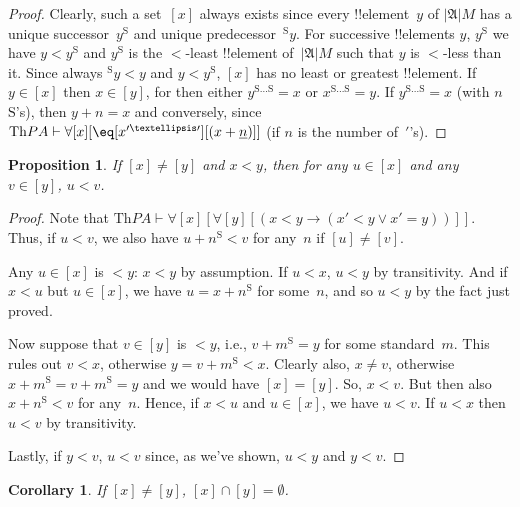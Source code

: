 \documentclass[10pt,a4paper]{article}
\theoremstyle{plain}
\newtheorem{prop}[thm]{Proposition}
\newtheorem{cor}[thm]{Corollary}
\theoremstyle{definition}
\theoremstyle{remark}
\providecommand{\lif}{\mathbin{\rightarrow}}
\providecommand{\lforall}{\mathord{\forall}}
\providecommand{\Proves}{\mathrel{\vdash}}
\providecommand{\Domain}{\ensuremath{|\mathfrak{A}|}}
\providecommand{\Th}{\ensuremath{\mathrm{Th}}}
\providecommand{\num}[1]{\underline{#1}}
\providecommand{\nssucc}{\mathrm{S}}
\providecommand{\nsplus}{\mathbin{+}}
\providecommand{\nsless}{<}
\begin{document}
\begin{proof}
Clearly, such a set~$[x]$ always exists since every !!{element}~$y$ of
$\Domain{M}$ has a unique successor~$y^\nssucc$ and unique
predecessor~$^\nssucc y$. For successive !!{element}s $y$, $y^\nssucc$
we have $y \nsless y^\nssucc$ and $y^\nssucc$ is the $\nsless$-least
!!{element} of~$\Domain{M}$ such that $y$ is $\nsless$-less than it.
Since always $^\nssucc y \nsless y$ and $y \nsless y^\nssucc$, $[x]$
has no least or greatest !!{element}. If $y \in [x]$ then $x \in [y]$,
for then either $y^{\nssucc\dots\nssucc} = x$ or
$x^{\nssucc\dots\nssucc} = y$.  If $y^{\nssucc\dots\nssucc} = x$ (with
$n$ $\nssucc$'s), then $y \nsplus n = x$ and conversely, since
$\Th{PA} \Proves \lforall[x][\eq[x^{\prime\dots\prime}][(x +
    \num{n})]]$ (if $n$ is the number of~$\prime$'s).
\end{proof}

\begin{prop}
If $[x] \neq [y]$ and $x \nsless y$, then for any $u \in [x]$ and any
$v \in [y]$, $u \nsless v$.
\end{prop}

\begin{proof}
Note that $\Th{PA} \Proves \lforall[x][\lforall[y][(x < y \lif (x' < y
    \lor x' = y))]]$. Thus, if $u \nsless v$, we also have $u \nsplus
n^\nssucc \nsless v$ for any~$n$ if $[u] \neq [v]$.

Any $u \in [x]$ is $\nsless y$: $x \nsless y$ by assumption. If $u
\nsless x$, $u \nsless y$ by transitivity. And if $x \nsless u$ but $u
\in [x]$, we have $u = x\nsplus n^\nssucc$ for some~$n$, and so $u
\nsless y$ by the fact just proved.
  
Now suppose that $v \in [y]$ is $\nsless y$, i.e., $v \nsplus
m^\nssucc = y$ for some standard~$m$. This rules out $v \nsless x$,
otherwise $y = v \nsplus m^\nssucc \nsless x$. Clearly also, $x \neq
v$, otherwise $x \nsplus m^\nssucc = v \nsplus m^\nssucc = y$ and we
would have $[x] = [y]$. So, $x \nsless v$. But then also $x \nsplus
n^\nssucc \nsless v$ for any~$n$. Hence, if $x \nsless u$ and $u \in
[x]$, we have $u \nsless v$. If $u \nsless x$ then $u \nsless v$ by
transitivity.

Lastly, if $y \nsless v$, $u \nsless v$ since, as we've shown, $u
\nsless y$ and $y \nsless v$.
\end{proof}

\begin{cor}
If $[x] \neq [y]$, $[x] \cap [y] = \emptyset$.
\end{cor}
\end{document}
